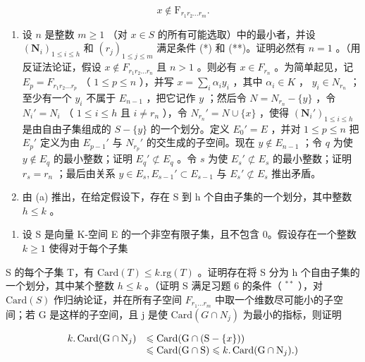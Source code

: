 \[
x \notin \mathrm{F} _ {r _ {1} r _ {2} \dots r _ {m}}.
\]

\begin{enumerate}
\def\labelenumi{(\alph{enumi})}
\item
  设 \(n\) 是整数 \(m \geqslant 1\) （对 \(x \in S\) 的所有可能选取）中的最小者，并设 \((\mathbf{N}_i)_{1 \leqslant i \leqslant h}\) 和 \((r_j)_{1 \leqslant j \leqslant m}\) 满足条件 (*) 和 (**)。证明必然有 \(n = 1\) 。（用反证法论证，假设 \(x \notin F_{r_1 r_2 \ldots r_n}\) 且 \(n > 1\) 。则必有 \(x \in F_{r_n}\) 。为简单起见，记 \(E_p = F_{r_1 r_2 \ldots r_p}\) （ \(1 \leqslant p \leqslant n\) ），并写 \(x = \sum_i \alpha_i y_i\) ，其中 \(\alpha_i \in K\) ， \(y_i \in N_{r_n}\) ；至少有一个 \(y_i\) 不属于 \(E_{n-1}\) ，把它记作 \(y\) ；然后令 \(N = N_{r_n} - \{y\}\) ，令 \(N_i' = N_i\) （ \(1 \leqslant i \leqslant h\) 且 \(i \neq r_n\) ），令 \(N_{r_n}' = N \cup \{x\}\) ，使得 \((\mathbf{N}_i')_{1 \leqslant i \leqslant h}\) 是由自由子集组成的 \(S - \{y\}\) 的一个划分。定义 \(E_0' = E\) ，并对 \(1 \leqslant p \leqslant n\) 把 \(E_p'\) 定义为由 \(E_{p-1}'\) 与 \(N_{r_p}'\) 的交生成的子空间。现在 \(y \notin E_{n-1}\) ；令 \(q\) 为使 \(y \notin E_q\) 的最小整数；证明 \(E_q' \not\subset E_q\) 。令 \(s\) 为使 \(E_s' \not\subset E_s\) 的最小整数；证明 \(r_s = r_n\) ；最后由关系 \(y \in E_s, E_{s-1}' \subset E_{s-1}\) 与 \(E_s' \not\subset E_s\) 推出矛盾。
\item
  由 (a) 推出，在给定假设下，存在 S 到 h 个自由子集的一个划分，其中整数 \(h \leqslant k\) 。
\end{enumerate}

\begin{enumerate}
\def\labelenumi{\arabic{enumi}.}
\setcounter{enumi}{6}
\tightlist
\item
  设 S 是向量 K-空间 E 的一个非空有限子集，且不包含 0。假设存在一个整数 \(k \geqslant 1\) 使得对于每个子集
\end{enumerate}

S 的每个子集 T，有 \(\text{Card}(T) \leqslant k.\text{rg}(T)\) 。证明存在将 S 分为 h 个自由子集的一个划分，其中某个整数 \(h \leqslant k\) 。（证明 S 满足习题 6 的条件（ \(^{**}\) ），对 \(\text{Card}(S)\) 作归纳论证，并在所有子空间 \(F_{r_{1}\ldots r_{m}}\) 中取一个维数尽可能小的子空间；若 G 是这样的子空间，且 j 是使 \(\text{Card}(G \cap N_{j})\) 为最小的指标，则证明

\[
\begin{array}{r l} k. \operatorname{Card} (\mathrm{G} \cap \mathrm{N} _ {j}) & \leqslant \operatorname{Card} (\mathrm{G} \cap (\mathrm{S} - \{x \})) \\ & \leqslant \operatorname{Card} (\mathrm{G} \cap \mathrm{S}) \leqslant k. \operatorname{Card} (\mathrm{G} \cap \mathrm{N} _ {j}).) \end{array}
\]

